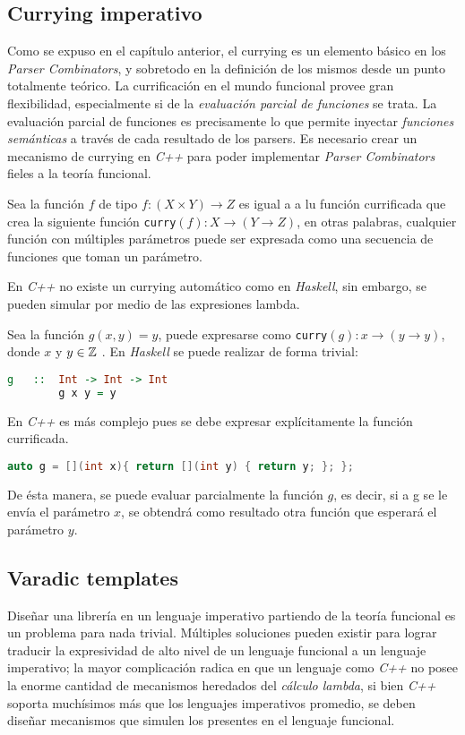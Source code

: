 	\subsection{Currying imperativo}
	Como se expuso en el capítulo anterior, el currying es un elemento básico en los \emph{Parser Combinators}, y sobretodo en la definición de los mismos desde un punto totalmente teórico. La currificación en el mundo funcional provee gran flexibilidad, especialmente si de la \emph{evaluación parcial de funciones} se trata. La evaluación parcial de funciones es precisamente lo que permite inyectar \emph{funciones semánticas} a través de cada resultado de los parsers.
	Es necesario crear un mecanismo de currying en \emph{C++} para poder implementar \emph{Parser Combinators} fieles a la teoría funcional.
	\newpage
	\begin{exmp}
		Sea la función $f$ de tipo
		$f:(X \times Y) \to Z$ es igual a a lu función currificada que crea la siguiente función \texttt{curry}$(f): X \to (Y \to Z)$, en otras palabras, cualquier función con múltiples parámetros puede ser expresada como una secuencia de funciones que toman un parámetro.		
	\end{exmp}
	
	En \emph{C++} no existe un currying automático como en \emph{Haskell}, sin embargo, se pueden simular por medio de las expresiones lambda.
	
	\begin{exmp}
		Sea la función $g(x,y) = y$, puede expresarse como \texttt{curry}$(g): x \to (y \to y)$, donde $x$ y $y \in \mathbb{Z}$ . En \emph{Haskell} se puede realizar de forma trivial:
		\begin{lstlisting}[language=Haskell, caption=g currificada en Haskell]
		g	::	Int -> Int -> Int
		g x y = y
		\end{lstlisting}
		
		En \emph{C++} es más complejo pues se debe expresar explícitamente la función currificada.		
		
		\begin{lstlisting}[language=C++, caption=g currificada en C++]
		auto g = [](int x){ return [](int y) { return y; }; };
		\end{lstlisting}	
		
		De ésta manera, se puede evaluar parcialmente la función $g$, es decir, si a g se le envía el parámetro $x$, se obtendrá como resultado otra función que esperará el parámetro $y$.	
	\end{exmp}
	
	\subsection{Varadic templates}
	Diseñar una librería en un lenguaje imperativo partiendo de la teoría funcional es un problema para nada trivial. Múltiples soluciones pueden existir para lograr traducir la expresividad de alto nivel de un lenguaje funcional a un lenguaje imperativo; la mayor complicación radica en que un lenguaje como \emph{C++} no posee la enorme cantidad de mecanismos heredados del \emph{cálculo lambda}, si bien \emph{C++} soporta muchísimos más que los lenguajes imperativos promedio, se deben diseñar mecanismos que simulen los presentes en el lenguaje funcional. 

